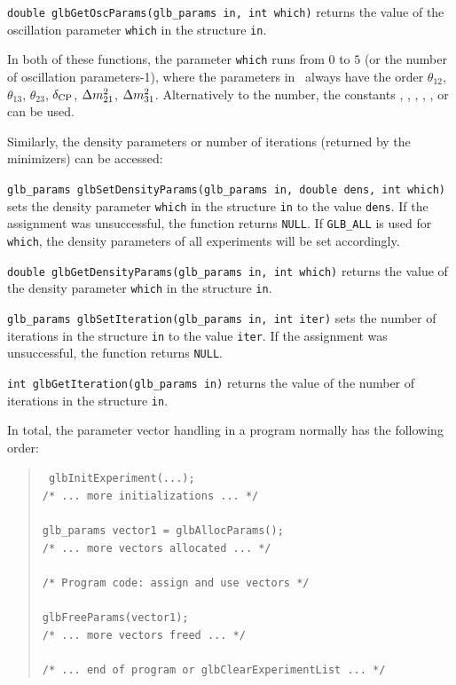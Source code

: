 \begin{function}
{\tt double glbGetOscParams(glb\_params in, int which)}
returns the value of the oscillation parameter {\tt which} in the 
structure {\tt in}.
\end{function}
In both of these functions, the parameter {\tt which} runs from
$0$ to $5$ (or the number of oscillation parameters-1), where the parameters in \GLOBES\ always have the order $\theta_{12}$, $\theta_{13}$, $\theta_{23}$, $\delta_{\mathrm{CP}}$, $\Delta m_{21}^2$, $\Delta m_{31}^2$.
Alternatively to the number, the constants , , , , 
, or  can be used.

Similarly, the density parameters or number of iterations 
(returned by the minimizers) can be accessed:
\begin{function}
{\tt glb\_params glbSetDensityParams(glb\_params in, double dens, int which)} sets the density parameter {\tt which} in the structure {\tt in}
to the value {\tt dens}. If the assignment was unsuccessful, the 
function returns {\tt NULL}. If {\tt GLB\_ALL} is used for {\tt which},
the density parameters of all experiments will be set accordingly.
\end{function}
\begin{function}
{\tt double glbGetDensityParams(glb\_params in, int which)}
returns the value of the density parameter {\tt which} in the 
structure {\tt in}.
\end{function} 
\begin{function}
 
{\tt glb\_params glbSetIteration(glb\_params in, int iter)} sets the number of iterations in the structure {\tt in}
to the value {\tt iter}. If the assignment was unsuccessful, the 
function returns {\tt NULL}.
\end{function}
\begin{function}
{\tt int glbGetIteration(glb\_params in)}
returns the value of the number of iterations in the 
structure {\tt in}.
\end{function}
In total, the parameter vector handling in a program normally has the
following order:
\begin{quote}
{\tt
glbInitExperiment(...); \\
/* ... more initializations ... */ \\
\\
glb\_params vector1 = glbAllocParams(); \\
/* ... more vectors allocated ... */ \\
\\
/* Program code: assign and use vectors */ \\
\\
glbFreeParams(vector1); \\
/* ... more vectors freed ... */ \\
\\
/* ... end of program or glbClearExperimentList ... */ 
}
\end{quote}

